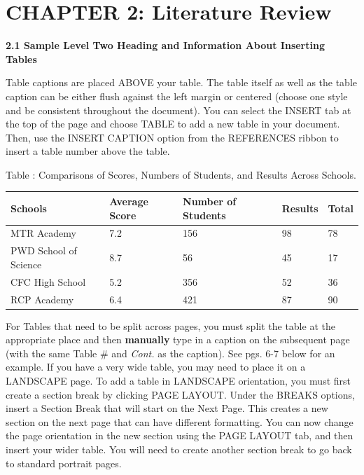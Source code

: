 \hypertarget{chapter-2-literature-review}{%
\section{\texorpdfstring{\hfill\break
CHAPTER 2: Literature
Review}{ CHAPTER 2: Literature Review}}\label{chapter-2-literature-review}}

\protect\hypertarget{_Toc114562020}{}{}\textbf{2.1 Sample Level Two
Heading and Information About Inserting Tables}

Table captions are placed ABOVE your table. The table itself as well as
the table caption can be either flush against the left margin or
centered (choose one style and be consistent throughout the document).
You can select the INSERT tab at the top of the page and choose TABLE to
add a new table in your document. Then, use the INSERT CAPTION option
from the REFERENCES ribbon to insert a table number above the table.

\protect\hypertarget{_Toc111537318}{}{}Table : Comparisons of Scores,
Numbers of Students, and Results Across Schools.

\begin{longtable}[]{@{}lllll@{}}
\toprule
Schools & Average Score & Number of Students & Results & Total \\
\midrule
\endhead
MTR Academy & 7.2 & 156 & 98 & 78 \\
PWD School of Science & 8.7 & 56 & 45 & 17 \\
CFC High School & 5.2 & 356 & 52 & 36 \\
RCP Academy & 6.4 & 421 & 87 & 90 \\
\bottomrule
\end{longtable}

For Tables that need to be split across pages, you must split the table
at the appropriate place and then \textbf{manually} type in a caption on
the subsequent page (with the same Table \# and \emph{Cont.} as the
caption). See pgs. 6-7 below for an example. If you have a very wide
table, you may need to place it on a LANDSCAPE page. To add a table in
LANDSCAPE orientation, you must first create a section break by clicking
PAGE LAYOUT. Under the BREAKS options, insert a Section Break that will
start on the Next Page. This creates a new section on the next page that
can have different formatting. You can now change the page orientation
in the new section using the PAGE LAYOUT tab, and then insert your wider
table. You will need to create another section break to go back to
standard portrait pages.

